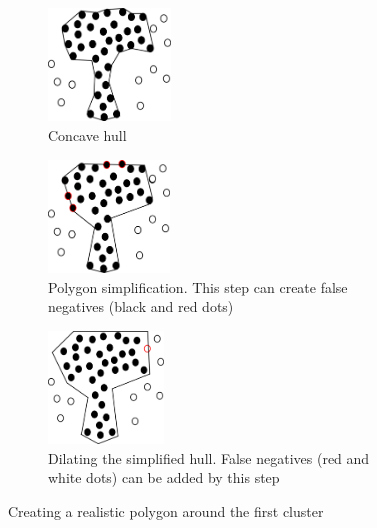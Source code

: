 \begin{figure}
\centering
\begin{subfigure}{.3\textwidth}
  \centering
  \includegraphics[height=3cm]{images/evaltool/tree1.png}
  \captionsetup{margin=5pt}
  \caption{Concave hull}
  \label{fig:concavehull}
\end{subfigure}%
\begin{subfigure}{.3\textwidth}
  \centering
  \includegraphics[height=3cm]{images/evaltool/tree2.png}
  \captionsetup{margin=5pt}
  \caption{Polygon simplification. This step can create false negatives (black and red dots)}
  \label{fig:simplification}
\end{subfigure}
\begin{subfigure}{.3\textwidth}
  \centering
  \includegraphics[height=3cm]{images/evaltool/tree3.png}
  \captionsetup{margin=5pt}
  \caption{Dilating the simplified hull. False negatives (red and white dots) can be added by this step}
  \label{fig:expand}
\end{subfigure}
\caption{Creating a realistic polygon around the first cluster}
\label{fig:polygoncluster}
\end{figure}



